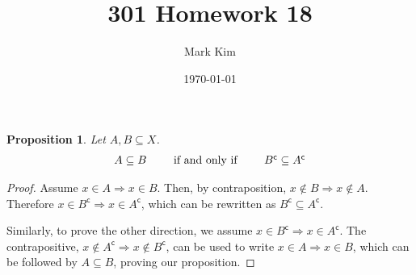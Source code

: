 \documentclass[12pt]{amsart}
\title{301 Homework 18}
\author{Mark Kim}
\date{\today}
\renewcommand{\complement}{^{\mathsf{c}}}
\newtheorem*{proposition}{Proposition}
\begin{document}
\maketitle

\begin{proposition}
Let $A,B\subseteq X$.
\begin{equation*}
\begin{tabular}{ c c c c c }
$A \subseteq B$ & & if and only if & & $B\complement \subseteq A\complement$\\
\end{tabular}
\end{equation*}
\end{proposition}

\begin{proof}
Assume $x\in A \Rightarrow x\in B$. Then, by contraposition, $x\notin B \Rightarrow x\notin A$.  Therefore $x\in B\complement \Rightarrow x\in A\complement$, which can be rewritten as $B\complement \subseteq A\complement$.

Similarly, to prove the other direction, we assume $x\in B\complement \Rightarrow x\in A\complement$.  The contrapositive, $x\notin A\complement \Rightarrow x\notin B\complement$, can be used to write $x\in A \Rightarrow x\in B$, which can be followed by $A\subseteq B$, proving our proposition.
\end{proof}
\end{document}
